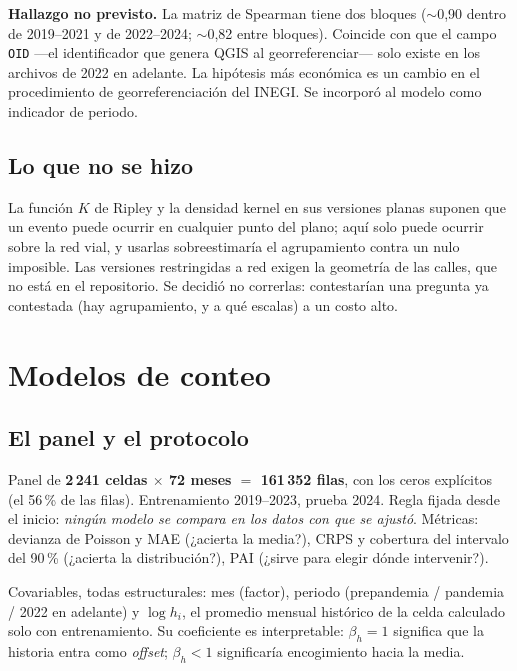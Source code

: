 \documentclass[11pt,a4paper]{article}
\begin{document}
\begin{advertencia}
\textbf{Hallazgo no previsto.} La matriz de Spearman tiene dos bloques
($\sim$0,90 dentro de 2019--2021 y de 2022--2024; $\sim$0,82 entre bloques).
Coincide con que el campo \texttt{OID} —el identificador que genera QGIS al
georreferenciar— solo existe en los archivos de 2022 en adelante. La hipótesis
más económica es un cambio en el procedimiento de georreferenciación del
INEGI. Se incorporó al modelo como indicador de periodo.
\end{advertencia}

\subsection{Lo que no se hizo}

La función $K$ de Ripley y la densidad kernel en sus versiones planas suponen
que un evento puede ocurrir en cualquier punto del plano; aquí solo puede
ocurrir sobre la red vial, y usarlas sobreestimaría el agrupamiento contra un
nulo imposible. Las versiones restringidas a red exigen la geometría de las
calles, que no está en el repositorio. Se decidió no correrlas: contestarían
una pregunta ya contestada (hay agrupamiento, y a qué escalas) a un costo alto.

\section{Modelos de conteo}

\subsection{El panel y el protocolo}

Panel de \textbf{2\,241 celdas $\times$ 72 meses $=$ 161\,352 filas}, con los
ceros explícitos (el 56\,\% de las filas). Entrenamiento 2019--2023, prueba
2024. Regla fijada desde el inicio: \emph{ningún modelo se compara en los datos
con que se ajustó}. Métricas: devianza de Poisson y MAE (¿acierta la media?),
CRPS y cobertura del intervalo del 90\,\% (¿acierta la distribución?), PAI
(¿sirve para elegir dónde intervenir?).

Covariables, todas estructurales: mes (factor), periodo (prepandemia /
pandemia / 2022 en adelante) y $\log h_i$, el promedio mensual histórico de la
celda calculado solo con entrenamiento. Su coeficiente es interpretable:
$\beta_h = 1$ significa que la historia entra como \emph{offset}; $\beta_h < 1$
significaría encogimiento hacia la media.
\end{document}
